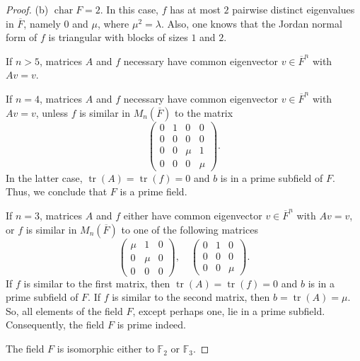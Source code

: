 \documentclass{amsart}
\DeclareMathOperator{\Char}{char}
\DeclareMathOperator{\tr}{tr}
\theoremstyle{definition}
\theoremstyle{remark}
\numberwithin{equation}{section}
\begin{document}
\begin{proof}
\medskip

(b) $\Char F = 2$. In this case, $f$ has at most $2$ pairwise distinct eigenvalues in $\overline{F}$, namely $0$ and $\mu$, where $\mu^{2}=\lambda$. Also, one knows that the Jordan normal form of $f$ is triangular with blocks of sizes $1$ and $2$.

\medskip

If $n>5$, matrices $A$ and $f$ necessary have common eigenvector $v \in \overline{F}^{n}$ with $Av = v$.

\medskip

If $n=4$, matrices $A$ and $f$ necessary have common eigenvector $v \in \overline{F}^{n}$ with $Av = v$, unless $f$ is similar in $M_{n}(\overline{F})$ to the matrix
\[
  \left(
  \begin{array}{cc|cc}
  0 & 1 & 0 & 0
  \\
  0 & 0 & 0 & 0
  \\
  \hline
  0 & 0 & \mu & 1
  \\
  0 & 0 & 0 & \mu
  \end{array}
  \right).
\]
In the latter case, $\tr(A) = \tr(f) = 0$ and $b$ is in a prime subfield of $F$. Thus, we conclude that $F$ is a prime field.

\medskip

If $n=3$, matrices $A$ and $f$ either have common eigenvector $v \in \overline{F}^{n}$ with $Av = v$, or $f$ is similar in $M_{n}(\overline{F})$ to one of the following matrices
\[
  \left(
  \begin{array}{cc|c}
  \mu & 1 & 0
  \\
  0 & \mu & 0
  \\
  \hline
  0 & 0 & 0
  \end{array}
  \right),
  \quad
  \left(
  \begin{array}{cc|c}
  0 & 1 & 0
  \\
  0 & 0 & 0
  \\
  \hline
  0 & 0 & \mu
  \end{array}
  \right).
\]
If $f$ is similar to the first matrix, then $\tr(A) = \tr(f) = 0$ and $b$ is in a prime subfield of $F$. If $f$ is similar to the second matrix, then $b = \tr(A) = \mu$. So, all elements of the field $F$, except perhaps one, lie in a prime subfield. Consequently, the field $F$ is prime indeed.

\medskip

 The field $F$ is isomorphic either to $\mathbb{F}_{2}$ or $\mathbb{F}_{3}$.

\medskip


\end{proof}
\end{document}
